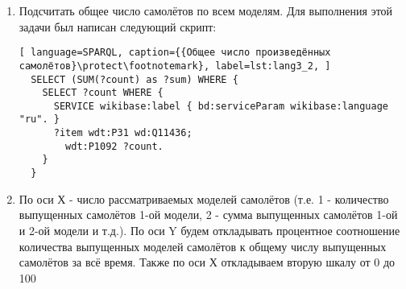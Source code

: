 \label{aircraft_question_2}

\begin{enumerate} 
  \item Подсчитать общее число самолётов по всем моделям. Для выполнения этой задачи был написан следующий скрипт:
  
  \begin{lstlisting}[ language=SPARQL, caption={{Общее число произведённых самолётов}\protect\footnotemark}, label=lst:lang3_2, ]
  SELECT (SUM(?count) as ?sum) WHERE {
    SELECT ?count WHERE {
      SERVICE wikibase:label { bd:serviceParam wikibase:language "ru". }
      ?item wdt:P31 wd:Q11436;
        wdt:P1092 ?count.
    }
  }
  \end{lstlisting}
  
  
  \item По оси Х - число рассматриваемых моделей самолётов (т.е. 1 - количество выпущенных самолётов 1-ой модели, 2 - сумма выпущенных самолётов 1-ой и 2-ой модели и т.д.). По оси Y будем откладывать процентное соотношение количества выпущенных моделей самолётов к общему числу выпущенных самолётов за всё время. Также по оси Х откладываем вторую шкалу от 0 до 100%
\end{enumerate}

\begin{figure*}[h]

    \setlength{\fboxsep}{0pt}%
    \setlength{\fboxrule}{1pt}%

	\caption{Распределение числа выпущенных моделей самолётов, 2020.}%
    \label{fig:Pareto_principle_diargam}%
\end{figure*}

